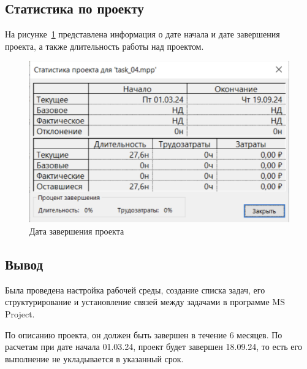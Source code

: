 \subsection*{Статистика по проекту}

На рисунке~\ref{fig:u10} представлена информация о дате начала и дате завершения проекта, а также длительность работы над проектом.

\begin{figure}[h!]
	\begin{center}
		\includegraphics[scale=0.55]{inc/img/p_13.png}
	\end{center}
	\captionsetup{justification=centering}
	\caption{Дата завершения проекта}
	\label{fig:u10}
\end{figure}

\subsection*{Вывод}

Была проведена настройка рабочей среды, создание списка задач, его
структурирование и установление связей между задачами в программе MS
Project.

По описанию проекта, он должен быть завершен в течение 6 месяцев. По
расчетам при дате начала 01.03.24, проект будет завершен 18.09.24, то есть его
выполнение не укладывается в указанный срок.
